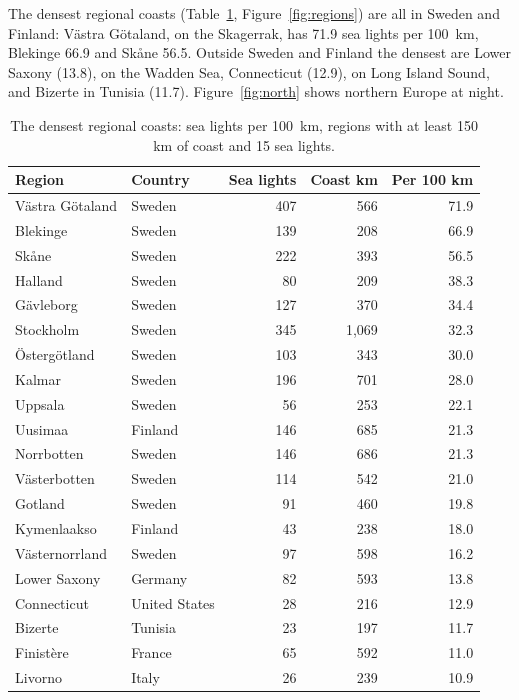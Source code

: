 \documentclass[11pt,a4paper]{article}
\begin{document}
The densest regional coasts (Table~\ref{tab:regions}, Figure~\ref{fig:regions}) are all in Sweden and Finland: Västra Götaland, on the Skagerrak, has 71.9 sea lights per 100~km, Blekinge 66.9 and Skåne 56.5. Outside Sweden and Finland the densest are Lower Saxony (13.8), on the Wadden Sea, Connecticut (12.9), on Long Island Sound, and Bizerte in Tunisia (11.7). Figure~\ref{fig:north} shows northern Europe at night.

\begin{table}[tbp]\centering\small\caption{The densest regional coasts: sea lights per 100~km, regions with at least 150 km of coast and 15 sea lights.}\label{tab:regions}\begin{tabular}{llrrr}\toprule Region & Country & Sea lights & Coast km & Per 100 km\\\midrule
Västra Götaland & Sweden & 407 & 566 & 71.9\\
Blekinge & Sweden & 139 & 208 & 66.9\\
Skåne & Sweden & 222 & 393 & 56.5\\
Halland & Sweden & 80 & 209 & 38.3\\
Gävleborg & Sweden & 127 & 370 & 34.4\\
Stockholm & Sweden & 345 & 1,069 & 32.3\\
Östergötland & Sweden & 103 & 343 & 30.0\\
Kalmar & Sweden & 196 & 701 & 28.0\\
Uppsala & Sweden & 56 & 253 & 22.1\\
Uusimaa & Finland & 146 & 685 & 21.3\\
Norrbotten & Sweden & 146 & 686 & 21.3\\
Västerbotten & Sweden & 114 & 542 & 21.0\\
Gotland & Sweden & 91 & 460 & 19.8\\
Kymenlaakso & Finland & 43 & 238 & 18.0\\
Västernorrland & Sweden & 97 & 598 & 16.2\\
Lower Saxony & Germany & 82 & 593 & 13.8\\
Connecticut & United States & 28 & 216 & 12.9\\
Bizerte & Tunisia & 23 & 197 & 11.7\\
Finistère & France & 65 & 592 & 11.0\\
Livorno & Italy & 26 & 239 & 10.9\\
\bottomrule\end{tabular}\end{table}
\end{document}

